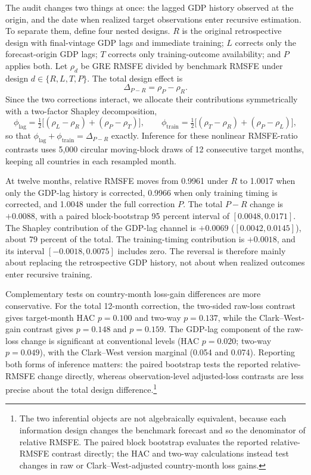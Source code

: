 \documentclass[preprint,12pt,authoryear]{elsarticle}
\begin{document}
The audit changes two things at once: the lagged GDP history observed at the
origin, and the date when realized target observations enter recursive
estimation. To separate them, define four nested designs. $R$ is the original
retrospective design with final-vintage GDP lags and immediate training; $L$
corrects only the forecast-origin GDP lags; $T$ corrects only training-outcome
availability; and $P$ applies both. Let $\rho_d$ be GRE RMSFE divided by
benchmark RMSFE under design $d \in \{R,L,T,P\}$. The total design effect is
\[
\Delta_{P-R} = \rho_P - \rho_R.
\]
Since the two corrections interact, we allocate their contributions
symmetrically with a two-factor Shapley decomposition,
\[
\phi_{\mathrm{lag}} = \tfrac12\bigl[(\rho_L - \rho_R) + (\rho_P - \rho_T)\bigr],
\qquad
\phi_{\mathrm{train}} = \tfrac12\bigl[(\rho_T - \rho_R) + (\rho_P - \rho_L)\bigr],
\]
so that $\phi_{\mathrm{lag}} + \phi_{\mathrm{train}} = \Delta_{P-R}$ exactly.
Inference for these nonlinear RMSFE-ratio contrasts uses 5,000 circular
moving-block draws of 12 consecutive target months, keeping all countries in
each resampled month.



At twelve months, relative RMSFE moves from 0.9961 under $R$ to 1.0017 when
only the GDP-lag history is corrected, 0.9966 when only training timing is
corrected, and 1.0048 under the full correction $P$. The total $P-R$ change is
$+0.0088$, with a paired block-bootstrap 95 percent interval of
$[0.0048, 0.0171]$. The Shapley contribution of the GDP-lag channel is
$+0.0069$ ($[0.0042, 0.0145]$), about 79 percent of the total. The
training-timing contribution is $+0.0018$, and its interval
$[-0.0018, 0.0075]$ includes zero. The reversal is therefore mainly about
replacing the retrospective GDP history, not about when realized outcomes
enter recursive training.

Complementary tests on country-month loss-gain differences are more
conservative. For the total 12-month correction, the two-sided raw-loss
contrast gives target-month HAC $p = 0.100$ and two-way $p = 0.137$, while the
Clark--West-gain contrast gives $p = 0.148$ and $p = 0.159$. The GDP-lag
component of the raw-loss change is significant at conventional levels (HAC
$p = 0.020$; two-way $p = 0.049$), with the Clark--West version marginal
(0.054 and 0.074). Reporting both forms of inference matters: the paired
bootstrap tests the reported relative-RMSFE change directly, whereas
observation-level adjusted-loss contrasts are less precise about the total
design difference.\footnote{The two inferential objects are not algebraically
equivalent, because each information design changes the benchmark forecast and
so the denominator of relative RMSFE. The paired block bootstrap evaluates the
reported relative-RMSFE contrast directly; the HAC and two-way calculations
instead test changes in raw or Clark--West-adjusted country-month loss gains.}
\end{document}

